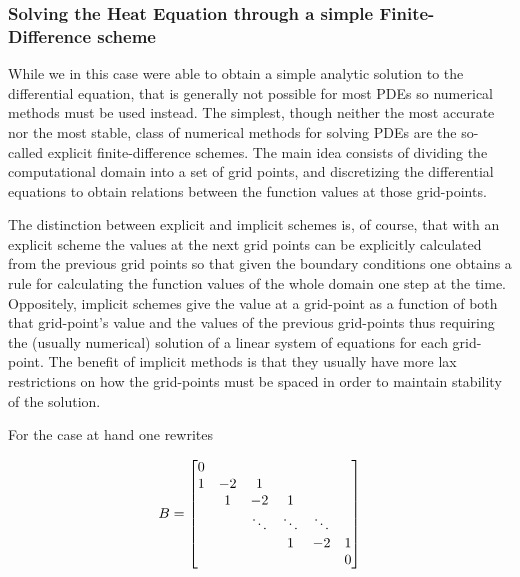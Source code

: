 \documentclass[reprint, english, nofootinbib]{revtex4-2}
\begin{document}
\subsubsection{Solving the Heat Equation through a simple Finite-Difference scheme}

While we in this case were able to obtain a simple analytic solution to the differential equation, that is generally not possible for most PDEs so numerical methods must be used instead. The simplest, though neither the most accurate nor the most stable, class of numerical methods for solving PDEs are the so-called explicit finite-difference schemes. The main idea consists of dividing the computational domain into a set of grid points, and discretizing the differential equations to obtain relations between the function values at those grid-points. 

The distinction between explicit and implicit schemes is, of course, that with an explicit scheme the values at the next grid points can be explicitly calculated from the previous grid points so that given the boundary conditions one obtains a rule for calculating the function values of the whole domain one step at the time. Oppositely, implicit schemes give the value at a grid-point as a function of both that grid-point's value and the values of the previous grid-points thus requiring the (usually numerical) solution of a linear system of equations for each grid-point. The benefit of implicit methods is that they usually have more lax restrictions on how the grid-points must be spaced in order to maintain stability of the solution.

For the case at hand one rewrites %

\begin{equation} \label{eqn: Az = b}
    B = \qty[
    \begin{matrix}
    0 \\
    1 & -2 & 1 \\
    & 1 & -2 & 1 \\
    && \ddots & \ddots & \ddots \\
    &&& 1 & -2 & 1 \\
    &&&&& 0
    \end{matrix}
    ]
 \end{equation}
\end{document}
